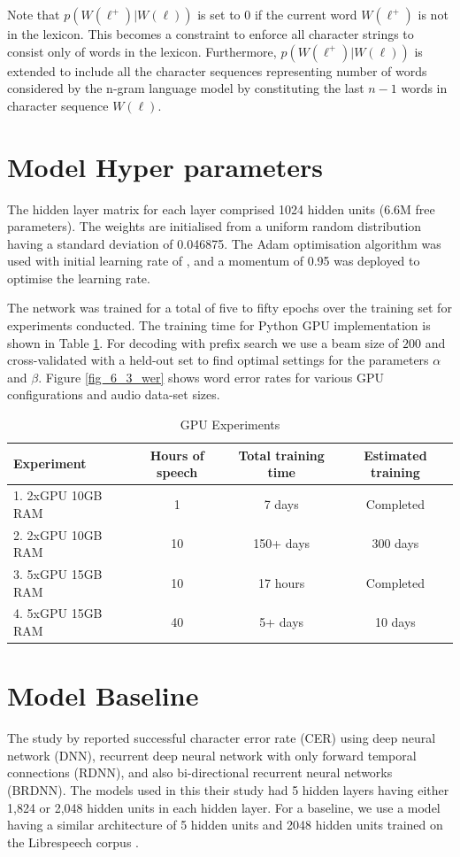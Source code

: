 Note that $p(W(\ell^+)|W(\ell))$ is set to $0$ if the current word $W(\ell^+)$ is not in the lexicon. This becomes a constraint to enforce all character strings to consist only of words in the lexicon.  Furthermore,  $p(W(\ell^+)|W(\ell))$ is extended to include all the character sequences representing number of words considered by the n-gram language model by constituting the last $n-1$ words in character sequence $W(\ell)$.

\section{Model Hyper parameters}
The hidden layer matrix for each layer comprised 1024 hidden units (6.6M free parameters).  The weights are initialised from a uniform random distribution having a standard deviation of 0.046875.  The Adam optimisation algorithm \citep{kingma2014adam} was used with initial learning rate of , and a momentum of 0.95 was deployed to optimise the learning rate.

The network was trained for a total of five to fifty epochs over the training set for experiments conducted. The training time for Python GPU implementation is shown in Table \ref{tab_c6_01_training}.  For decoding with prefix search we use a beam size of $200$ and cross-validated with a held-out set to find optimal settings for the parameters $\alpha$ and $\beta$. Figure \ref{fig_6_3_wer} shows word error rates for various GPU configurations and audio data-set sizes.

\begin{table}
  \caption{GPU Experiments}
  \label{tab_c6_01_training}
\begin{tabular}{lccc}
\toprule
Experiment & Hours of speech & Total training time & Estimated training\\
\midrule
1. 2xGPU 10GB RAM & 1 & 7 days & Completed\\
2. 2xGPU 10GB RAM & 10 & 150+ days & 300 days\\
3. 5xGPU 15GB RAM & 10 & 17 hours & Completed\\
4. 5xGPU 15GB RAM & 40 & 5+ days & 10 days\\
\bottomrule
\end{tabular}
\end{table}

\section{Model Baseline}
The study by \cite{hannun2014first} reported successful character error rate (CER)  using deep neural network (DNN), recurrent deep neural network with only forward temporal connections (RDNN), and also bi-directional recurrent neural networks (BRDNN). The models used in this their study had 5 hidden layers having either 1,824 or 2,048 hidden units in each hidden layer.  For a baseline, we use a model having a similar architecture of 5 hidden units and 2048 hidden units trained on the Librespeech corpus \citep{panayotov2015librispeech, mozilla/deepspeech_2019}. 

